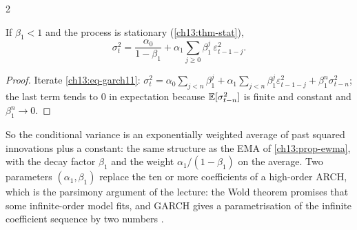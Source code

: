 \begin{paracol}{2}
\begin{proposition}\label{ch13:prop-archinf}
If $\beta_1<1$ and the process is stationary (\cref{ch13:thm-stat}),
\[
  \sigma_t^2=\frac{\alpha_0}{1-\beta_1}+\alpha_1\sum_{j\ge0}\beta_1^j\,\varepsilon_{t-1-j}^2 .
\]
\end{proposition}
\begin{proof}
Iterate \eqref{ch13:eq-garch11}: $\sigma_t^2=\alpha_0\sum_{j<n}\beta_1^j+\alpha_1\sum_{j<n}\beta_1^j\varepsilon^2_{t-1-j}+\beta_1^n\sigma^2_{t-n}$; the last term tends to $0$ in expectation
because $\mathbb{E}[\sigma^2_{t-n}]$ is finite and constant and $\beta_1^n\to0$.
\end{proof}
So the conditional variance is an exponentially weighted average of past squared innovations plus a constant: the same structure as the EMA of
\cref{ch13:prop-ewma}, with the decay factor $\beta_1$ and the weight $\alpha_1/(1-\beta_1)$ on the average. Two parameters $(\alpha_1,\beta_1)$ replace the ten or more coefficients of a high-order ARCH,
which is the parsimony argument of the lecture: the Wold theorem promises that some infinite-order model fits, and GARCH gives a parametrisation of the infinite coefficient sequence by two numbers
.


\end{paracol}
